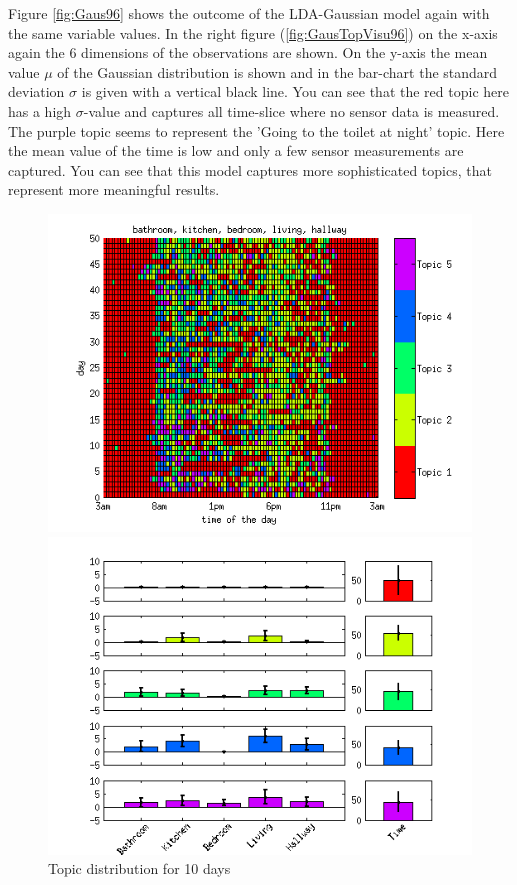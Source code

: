 Figure \ref{fig:Gaus96} shows the outcome of the LDA-Gaussian model again with the same variable values. In the right figure (\ref{fig:GausTopVisu96}) on the x-axis again the 6 dimensions of the observations are shown. On the y-axis the mean value $\mu$ of the Gaussian distribution is shown and in the bar-chart the standard deviation $\sigma$ is given with a vertical black line. You can see that the red topic here has a high $\sigma$-value and captures all time-slice where no sensor data is measured. The purple topic seems to represent the 'Going to the toilet at night' topic. Here the mean value of the time is low and only a few sensor measurements are captured. You can see that this model captures more sophisticated topics, that represent more meaningful results.

\begin{figure}
 \centering
 \begin{minipage}[b]{0.45\linewidth}
  \centering
  \includegraphics[width=\textwidth]{Pictures/TopDayTS96k5Gaus.png}
  \caption{Topic distribution for 10 days}
 \end{minipage}
 \begin{minipage}[b]{0.45\linewidth}
  \centering
  \includegraphics[width=\textwidth]{Pictures/TopVisuTS96k5Gaus.png}

\end{minipage}
\end{figure}
